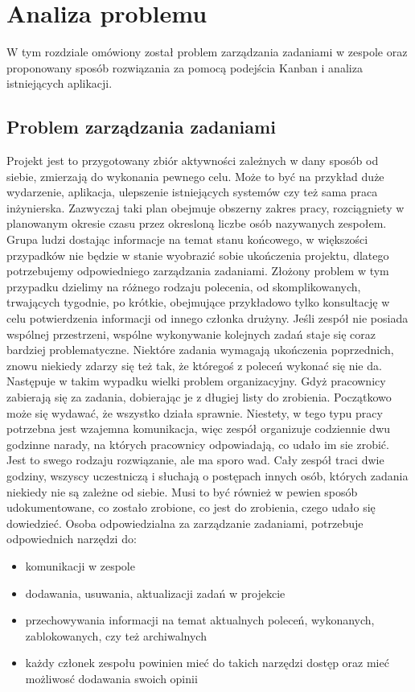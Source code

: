 
\chapter{Analiza problemu}
\thispagestyle{chapterBeginStyle}

W tym rozdziale omówiony został problem zarządzania zadaniami w zespole oraz proponowany sposób rozwiązania za pomocą podejścia Kanban i analiza istniejących aplikacji.
\section{Problem zarządzania zadaniami}

Projekt jest to przygotowany zbiór aktywności zależnych w dany sposób od siebie, zmierzają do wykonania pewnego celu. Może to być na przykład duże wydarzenie, aplikacja, ulepszenie istniejących systemów czy też sama praca inżynierska. Zazwyczaj taki plan obejmuje obszerny zakres pracy, rozciągniety w planowanym okresie czasu przez okresloną liczbe osób nazywanych zespołem. Grupa ludzi dostając informacje na temat stanu końcowego, w większości przypadków nie będzie w stanie wyobrazić sobie ukończenia projektu, dlatego potrzebujemy odpowiedniego zarządzania zadaniami. Złożony problem w tym przypadku dzielimy na różnego rodzaju polecenia, od skomplikowanych, trwających tygodnie, po krótkie, obejmujące przykładowo tylko konsultację w celu potwierdzenia informacji od innego członka drużyny. Jeśli zespół nie posiada wspólnej przestrzeni, wspólne wykonywanie kolejnych zadań staje się coraz bardziej problematyczne. Niektóre zadania wymagają ukończenia poprzednich, znowu niekiedy zdarzy się też tak, że któregoś z poleceń wykonać się nie da. Następuje w takim wypadku wielki problem organizacyjny.  Gdyż pracownicy zabierają się za zadania, dobierając je z długiej listy do zrobienia. Początkowo może się wydawać, że wszystko działa sprawnie. Niestety, w tego typu pracy potrzebna jest wzajemna komunikacja, więc zespół organizuje codziennie dwu godzinne narady, na których pracownicy odpowiadają, co udało im sie zrobić. Jest to swego rodzaju rozwiązanie, ale ma sporo wad. Cały zespół traci dwie godziny, wszyscy uczestniczą i słuchają o postępach innych osób, których zadania niekiedy nie są zależne od siebie. Musi to być również w pewien sposób udokumentowane, co zostało zrobione, co jest do zrobienia, czego udało się dowiedzieć. Osoba odpowiedzialna za zarządzanie zadaniami, potrzebuje odpowiednich narzędzi do:
\begin{itemize}
	\item  komunikacji w zespole
	\item  dodawania, usuwania, aktualizacji zadań w projekcie
	\item  przechowywania informacji na temat aktualnych poleceń, wykonanych, zablokowanych, czy też archiwalnych
	\item każdy członek zespołu powinien mieć do takich narzędzi dostęp oraz mieć możliwosć dodawania swoich opinii
\end{itemize}
